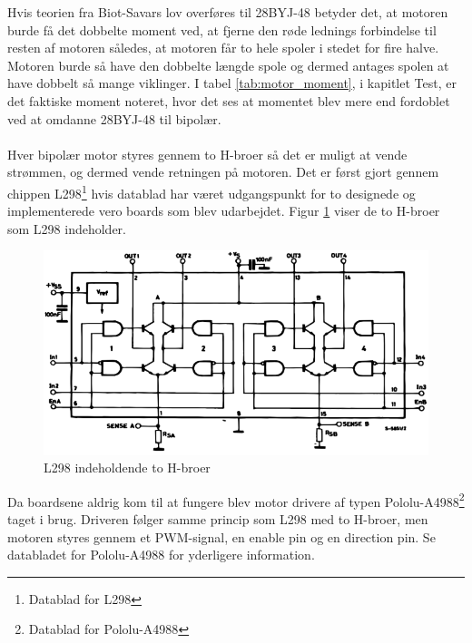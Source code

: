 \noindent
Hvis teorien fra Biot-Savars lov overføres til 28BYJ-48 betyder det, at motoren burde få det dobbelte moment ved, at fjerne den røde lednings forbindelse til resten af motoren således, at motoren får to hele spoler i stedet for fire halve. Motoren burde så have den dobbelte længde spole og dermed antages spolen at have dobbelt så mange viklinger. I tabel \ref{tab:motor_moment}, i kapitlet Test, er det faktiske moment noteret, hvor det ses at momentet blev mere end fordoblet ved at omdanne 28BYJ-48 til bipolær.
\\
\\
Hver bipolær motor styres gennem to H-broer så det er muligt at vende strømmen, og dermed vende retningen på motoren. Det er først gjort gennem chippen L298\footnote{Datablad for L298} hvis datablad har været udgangspunkt for to designede og implementerede vero boards som blev udarbejdet. Figur \ref{fig:L298} viser de to H-broer som L298 indeholder.

\begin{figure}[H]
	\centerline{\includegraphics[scale=0.33]{tex/Design/L298}}
	\caption{L298 indeholdende to H-broer}
	\label{fig:L298}
\end{figure}

\noindent
Da boardsene aldrig kom til at fungere blev motor drivere af typen Pololu-A4988\footnote{Datablad for Pololu-A4988} taget i brug. Driveren følger samme princip som L298 med to H-broer, men motoren styres gennem et PWM-signal, en enable pin og en direction pin. Se databladet for Pololu-A4988 for yderligere information.